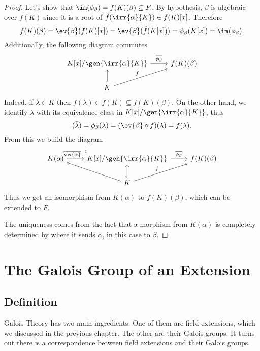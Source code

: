 \documentclass[12pt,oneside]{book}
\begin{document}
\begin{proof}
	Let's show that \( \im(\phi_\beta) = f(K)(\beta) \subseteq F \). By hypothesis, \( \beta
	\) is algebraic over \( f(K) \) since it is a root of \( \hat{f}(\irr{\alpha}{K}) \in
	f(K)[x] \). Therefore 
	\begin{equation*}
		f(K)(\beta) = \ev{\beta}(f(K)[x]) = \ev{\beta}(\hat{f}(K[x])) = \phi_\beta(K[x]) =
		\im(\phi_\beta).
	\end{equation*}
	Additionally, the following diagram commutes
	\begin{equation*}
		\begin{tikzcd}
			K[x]/\gen{\irr{\alpha}{K}} \arrow[r, "\overline{\phi_\beta}"] & f(K)(\beta) \\
			K \arrow[u, hook] \arrow[ru, "f"] & 
		\end{tikzcd}
	\end{equation*}
	Indeed, if \( \lambda \in K \) then \( f(\lambda) \in f(K) \subseteq f(K)(\beta) \). On
	the other hand, we identify \( \lambda \) with its equivalence class in \(
	K[x]/\gen{\irr{\alpha}{K}} \), thus
	\begin{equation*}
		\overline{}(\bar{\lambda}) = \phi_\beta(\lambda) = (\ev{\beta} \circ
		f)(\lambda) = f(\lambda).
	\end{equation*}
	From this we build the diagram
	\begin{equation*}
		\begin{tikzcd}
			K(\alpha) \arrow[r, "\overline{\ev{\alpha}}^{-1}"] & K[x]/\gen{\irr{\alpha}{K}}
			\arrow[r, "\overline{\phi_\beta}"] & f(K)(\beta) \\
																				 & K \arrow[ul, hook] \arrow[u, hook] \arrow[ru,
			"f"] & 
		\end{tikzcd}
	\end{equation*}
	Thus we get an isomorphism from \( K(\alpha) \) to \( f(K)(\beta) \), which can be
	extended to \( F \). 

	The uniqueness comes from the fact that a morphism from \( K(\alpha) \) is completely
	determined by where it sends \( \alpha \), in this case to \( \beta \).
\end{proof}



\chapter{The Galois Group of an Extension}
\section{Definition}
Galois Theory has two main ingredients. One of them are field extensions, which we
discussed in the previous chapter. The other are their Galois groups. It turns out there
is a correspondence between field extensions and their Galois groups. 
\end{document}
